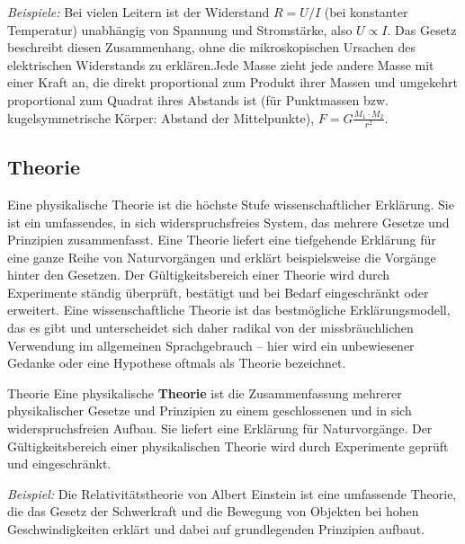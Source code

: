 \textit{Beispiele:}  Bei vielen Leitern ist der Widerstand $R = U/I$ (bei konstanter Temperatur) unabhängig von Spannung und Stromstärke, also $U \propto I$. Das Gesetz beschreibt diesen Zusammenhang, ohne die mikroskopischen Ursachen des elektrischen Widerstands zu erklären.\newline
[Gravitationsgesetz] Jede Masse zieht jede andere Masse mit einer Kraft an, die direkt proportional zum Produkt ihrer Massen und umgekehrt proportional zum Quadrat ihres Abstands ist (für Punktmassen bzw. kugelsymmetrische Körper: Abstand der Mittelpunkte), $F = G \frac{M_1 \cdot M_2}{r^2}$.


\subsection{Theorie}\label{subsec: Theorie}
Eine physikalische Theorie ist die höchste Stufe wissenschaftlicher Erklärung. Sie ist ein umfassendes, in sich widerspruchsfreies System, das mehrere Gesetze und Prinzipien zusammenfasst. Eine Theorie liefert eine tiefgehende Erklärung für eine ganze Reihe von Naturvorgängen und erklärt beispielsweise die Vorgänge hinter den Gesetzen. Der Gültigkeitsbereich einer Theorie wird durch Experimente ständig überprüft, bestätigt und bei Bedarf eingeschränkt oder erweitert. Eine wissenschaftliche Theorie ist das bestmögliche Erklärungsmodell, das es gibt und unterscheidet sich daher radikal von der missbräuchlichen Verwendung im allgemeinen Sprachgebrauch -- hier wird ein unbewiesener Gedanke oder eine Hypothese oftmals als Theorie bezeichnet.
\begin{rememberbox}[]{Theorie}
    Eine physikalische \textbf{Theorie} ist die Zusammenfassung mehrerer physikalischer Gesetze und Prinzipien zu einem geschlossenen und in sich widerspruchsfreien Aufbau. Sie liefert eine Erklärung für Naturvorgänge. 
Der Gültigkeitsbereich einer physikalischen Theorie wird durch Experimente geprüft und eingeschränkt.

\end{rememberbox}

\textit{Beispiel:} \newline
Die Relativitätstheorie von Albert Einstein ist eine umfassende Theorie, die das Gesetz der Schwerkraft und die Bewegung von Objekten bei hohen Geschwindigkeiten erklärt und dabei auf grundlegenden Prinzipien aufbaut.

\newpage